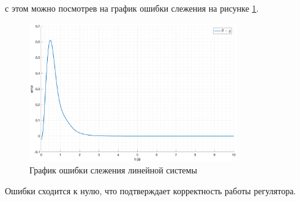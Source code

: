 с этом можно посмотрев на график ошибки слежения на рисунке \ref{fig:tracking_lin_err}. 
\begin{figure}[ht!]
    \centering
    \includegraphics[width=0.8\textwidth]{media/plots/follow/linear_error_1.png}
    \caption{График ошибки слежения линейной системы}
    \label{fig:tracking_lin_err}
\end{figure}
Ошибки сходится к нулю, что подтверждает корректность работы регулятора. 

